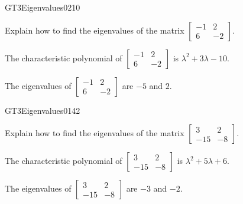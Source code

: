 \newpage




\begin{exercise}{GT3}{Eigenvalues}{0210} 
\begin{exerciseStatement} 

Explain how to find the eigenvalues of the matrix \(\left[\begin{array}{cc}
-1 & 2 \\
6 & -2
\end{array}\right]\).

 \end{exerciseStatement}
 \begin{exerciseAnswer} 

The characteristic polynomial of \(\left[\begin{array}{cc}
-1 & 2 \\
6 & -2
\end{array}\right]\) is \(\lambda^{2} + 3 \lambda - 10\).

 

The eigenvalues of \(\left[\begin{array}{cc}
-1 & 2 \\
6 & -2
\end{array}\right]\) are \(-5\) and \(2\).

 \end{exerciseAnswer}
 \end{exercise}



\begin{exercise}{GT3}{Eigenvalues}{0142} 
\begin{exerciseStatement} 

Explain how to find the eigenvalues of the matrix \(\left[\begin{array}{cc}
3 & 2 \\
-15 & -8
\end{array}\right]\).

 \end{exerciseStatement}
 \begin{exerciseAnswer} 

The characteristic polynomial of \(\left[\begin{array}{cc}
3 & 2 \\
-15 & -8
\end{array}\right]\) is \(\lambda^{2} + 5 \lambda + 6\).

 

The eigenvalues of \(\left[\begin{array}{cc}
3 & 2 \\
-15 & -8
\end{array}\right]\) are \(-3\) and \(-2\).

 \end{exerciseAnswer}
 \end{exercise}


